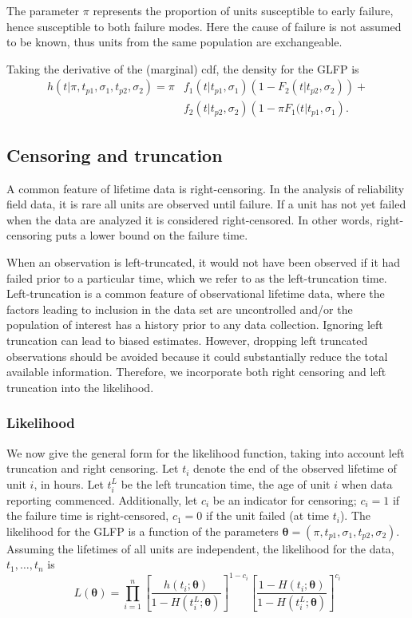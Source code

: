 \documentclass[12pt]{article}
\begin{document}
 
The parameter $\pi$ represents the proportion of units susceptible to early failure, hence susceptible to both failure modes. Here the cause of failure is not assumed to be known, thus units from the same population are exchangeable.

Taking the derivative of the (marginal) cdf, the density for the GLFP is
\begin{align*}
h(t|\pi, t_{p1},\sigma_1, t_{p2}, \sigma_2) = \pi & f_1(t|t_{p1},\sigma_1)\left(1-F_2(t|t_{p2},\sigma_2)\right) + \\ & f_2(t|t_{p2},\sigma_2)\left(1-\pi F_1(t|t_{p1},\sigma_1\right).
\end{align*}

\subsection{Censoring and truncation}
A common feature of lifetime data is right-censoring. In the analysis of reliability field data, it is rare all units are observed until failure. If a unit has not yet failed when the data are analyzed it is considered right-censored.  In other words, right-censoring puts a lower bound on the failure time.


When an observation is left-truncated, it would not have been observed if it had failed prior to a particular time, which we refer to as the left-truncation time.  Left-truncation is a common feature of observational lifetime data, where the factors leading to inclusion in the data set are uncontrolled and/or the population of interest has a history prior to any data collection. Ignoring left truncation can lead to biased estimates. However, dropping left truncated observations should be avoided because it could substantially reduce the total available information.  Therefore, we incorporate both right censoring and left truncation into the likelihood. 


\subsubsection{Likelihood}
We now give the general form for the likelihood function, taking into account left truncation and right censoring.  Let $t_{i}$ denote the end of the observed lifetime of unit $i$, in hours.  Let $t_i^L$ be the left truncation time, the age of unit $i$ when data reporting commenced. Additionally, let $c_i$ be an indicator for censoring; $c_i=1$ if the failure time is right-censored, $c_1=0$ if the unit failed (at time $t_i$). The likelihood for the GLFP is a function of the parameters $\bm{\theta} = (\pi,t_{p1}, \sigma_1, t_{p2}, \sigma_2)$.  Assuming the lifetimes of all units are independent, the likelihood for the data, $t_1,\ldots,t_n$ is
\begin{equation*}
L(\bm{\theta})= \prod_{i=1}^{n} \left[\frac{h(t_i;\bm{\theta})}{1-H(t_i^L;\bm{\theta})}\right]^{1-c_i} \left[ \frac{1-H(t_i;\bm{\theta})}{1-H(t_i^L;\bm{\theta})} \right]^{c_i}
\end{equation*}
\end{document}
